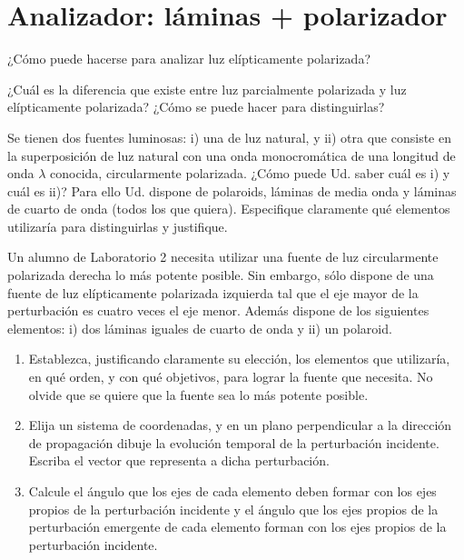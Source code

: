 \section*{Analizador: láminas + polarizador}

\item ¿Cómo puede hacerse para analizar luz elípticamente polarizada?


\item ¿Cuál es la diferencia que existe entre luz parcialmente polarizada y luz elípticamente polarizada?
¿Cómo se puede hacer para distinguirlas?



\item Se tienen dos fuentes luminosas: i) una de luz natural, y ii) otra que consiste en la superposición de luz natural con una onda monocromática de una longitud de onda $\lambda$ conocida, circularmente polarizada.
¿Cómo puede Ud. saber cuál es i) y cuál es ii)?
Para ello Ud. dispone de polaroids, láminas de media onda y láminas de cuarto de onda (todos los que quiera).
Especifique claramente qué elementos utilizaría para distinguirlas y justifique.



\item Un alumno de Laboratorio 2 necesita utilizar una fuente de luz circularmente polarizada derecha lo más potente posible.
Sin embargo, sólo dispone de una fuente de luz elípticamente polarizada izquierda tal que el eje mayor de la perturbación es cuatro veces el eje menor.
Además dispone de los siguientes elementos: i) dos láminas iguales de cuarto de onda y ii) un polaroid.
\begin{enumerate}
	\item Establezca, justificando claramente su elección, los elementos que utilizaría, en qué orden, y con qué objetivos, para lograr la fuente que necesita.
	No olvide que se quiere que la fuente sea lo más potente posible.
	\item Elija un sistema de coordenadas, y en un plano perpendicular a la dirección de propagación dibuje la evolución temporal de la perturbación incidente.
	Escriba el vector que representa a dicha perturbación.
	\item Calcule el ángulo que los ejes de cada elemento deben formar con los ejes propios de la perturbación incidente y el ángulo que los ejes propios de la perturbación emergente de cada elemento forman con los ejes propios de la perturbación incidente.
\end{enumerate}



